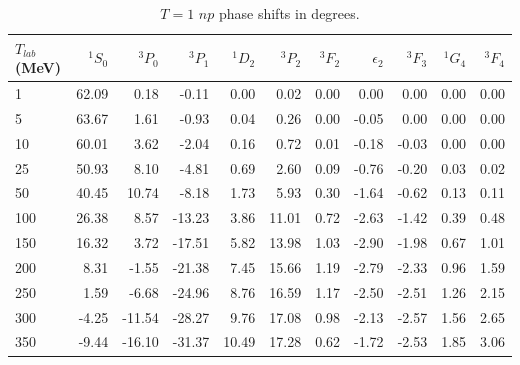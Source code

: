 \begin{table}
\caption{$T=1$ $np$ phase shifts in degrees.}
\begin{tabular}{lrrrrrrrrrr}
 $T_{lab}$ (MeV)
 & $^1S_0$
 & $^3P_0$
 & $^3P_1$
 & $^1D_2$
 & $^3P_2$
 & $^3F_2$
 & $\epsilon_2$
 & $^3F_3$
 & $^1G_4$
 & $^3F_4$
\\
 \hline 
    1 &  62.09 &   0.18 &  -0.11 &   0.00 &   0.02 &   0.00 &   0.00 &   0.00 &   0.00 &   0.00 \\
    5 &  63.67 &   1.61 &  -0.93 &   0.04 &   0.26 &   0.00 &  -0.05 &   0.00 &   0.00 &   0.00 \\
   10 &  60.01 &   3.62 &  -2.04 &   0.16 &   0.72 &   0.01 &  -0.18 &  -0.03 &   0.00 &   0.00 \\
   25 &  50.93 &   8.10 &  -4.81 &   0.69 &   2.60 &   0.09 &  -0.76 &  -0.20 &   0.03 &   0.02 \\
   50 &  40.45 &  10.74 &  -8.18 &   1.73 &   5.93 &   0.30 &  -1.64 &  -0.62 &   0.13 &   0.11 \\
  100 &  26.38 &   8.57 & -13.23 &   3.86 &  11.01 &   0.72 &  -2.63 &  -1.42 &   0.39 &   0.48 \\
  150 &  16.32 &   3.72 & -17.51 &   5.82 &  13.98 &   1.03 &  -2.90 &  -1.98 &   0.67 &   1.01 \\
  200 &   8.31 &  -1.55 & -21.38 &   7.45 &  15.66 &   1.19 &  -2.79 &  -2.33 &   0.96 &   1.59 \\
  250 &   1.59 &  -6.68 & -24.96 &   8.76 &  16.59 &   1.17 &  -2.50 &  -2.51 &   1.26 &   2.15 \\
  300 &  -4.25 & -11.54 & -28.27 &   9.76 &  17.08 &   0.98 &  -2.13 &  -2.57 &   1.56 &   2.65 \\
  350 &  -9.44 & -16.10 & -31.37 &  10.49 &  17.28 &   0.62 &  -1.72 &  -2.53 &   1.85 &   3.06 \\
\end{tabular}
\label{tab_phnp1}
\end{table}

\vspace*{5cm}


